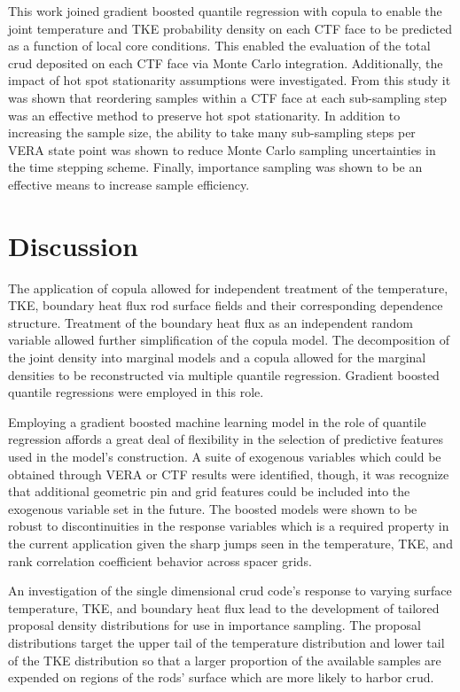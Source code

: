 
This work joined gradient boosted quantile regression with copula to enable the joint temperature and TKE probability density on each CTF face to be predicted as a function of local core conditions.  This enabled the evaluation of the total crud deposited on each CTF face via Monte Carlo integration.  Additionally, the impact of hot spot stationarity assumptions were investigated.  From this study it was shown that reordering samples within a CTF face at each sub-sampling step was an effective method to preserve hot spot stationarity.  In addition to increasing the sample size, the ability to take many sub-sampling steps per VERA state point was shown to reduce Monte Carlo sampling uncertainties in the time stepping scheme.  Finally, importance sampling was shown to be an effective means to increase sample efficiency.

\section{Discussion}

The application of copula allowed for independent treatment of the temperature, TKE, boundary heat flux rod surface fields and their corresponding dependence structure.  Treatment of the boundary heat flux as an independent random variable allowed further simplification of the copula model.  The decomposition of the joint density into marginal models and a copula allowed for the marginal densities to be reconstructed via multiple quantile regression.  Gradient boosted quantile regressions were employed in this role.

Employing a gradient boosted machine learning model in the role of quantile regression affords a great deal of flexibility in the selection of predictive features used in the model's construction.  A suite of exogenous variables which could be obtained through VERA or CTF results were identified, though, it was recognize that additional geometric pin and grid features could be included into the exogenous variable set in the future.  The boosted models were shown to be robust to discontinuities in the response variables which is a required property in the current application given the sharp jumps seen in the temperature, TKE, and rank correlation coefficient behavior across spacer grids. 

An investigation of the single dimensional crud code's response to varying surface temperature, TKE, and boundary heat flux lead to the development of tailored proposal density distributions for use in importance sampling.   The proposal distributions target the upper tail of the temperature distribution and lower tail of the TKE distribution so that a larger proportion of the available samples are expended on regions of the rods' surface which are more likely to harbor crud.  


